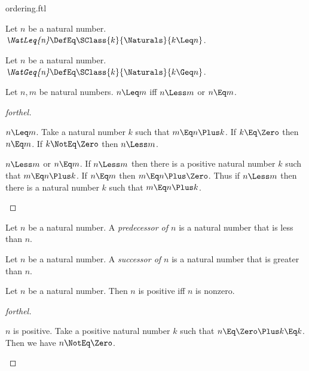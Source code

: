 \documentclass{stex}
\begin{document}
\begin{smodule}{ordering.ftl}
\begin{definition*}[forthel,for=NatLeq]
  Let $n$ be a natural number.
  $\emph{\NatLeq{n}} \DefEq \SClass{k}{\Naturals}{k \Leq n}$.
\end{definition*}

\begin{definition*}[forthel,for=NatGeq]
  Let $n$ be a natural number.
  $\emph{\NatGeq{n}} \DefEq \SClass{k}{\Naturals}{k \Geq n }$.
\end{definition*}

\begin{proposition*}[forthel]
  Let $n, m$ be natural numbers.
  $n \Leq m$ iff $n \Less m$ or $n \Eq m$.
\end{proposition*}
\begin{proof}[forthel]
  \begin{case}{$n \Leq m$.}
    Take a natural number $k$ such that $m \Eq n \Plus k$.
    If $k \Eq \Zero$ then $n \Eq m$. If $k \NotEq \Zero$ then $n \Less m$.
  \end{case}

  \begin{case}{$n \Less m$ or $n \Eq m$.}
    If $n \Less m$ then there is a positive natural number $k$ such that $m \Eq n \Plus k$.
    If $n \Eq m$ then $m \Eq n \Plus \Zero$.
    Thus if $n \Less m$ then there is a natural number $k$ such that $m \Eq n \Plus k$.
  \end{case}
\end{proof}

\begin{definition*}[forthel,for=predecessor]
  Let $n$ be a natural number.
  A \emph{predecessor of $n$} is a natural number that is less than $n$.
\end{definition*}

\begin{definition*}[forthel,for=successor]
  Let $n$ be a natural number.
  A \emph{successor of $n$} is a natural number that is greater than $n$.
\end{definition*}

\begin{proposition*}[forthel]
  Let $n$ be a natural number.
  Then $n$ is positive iff $n$ is nonzero.
\end{proposition*}
\begin{proof}[forthel]
  \begin{case}{$n$ is positive.}
    Take a positive natural number $k$ such that $n \Eq \Zero \Plus k \Eq k$.
    Then we have $n \NotEq \Zero$.
  \end{case}


\end{proof}
\end{smodule}
\end{document}
